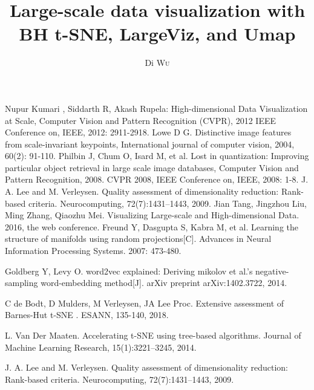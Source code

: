\documentclass{EPL-master-thesis-covers-EN}
\title{Large-scale data visualization with BH t-SNE, LargeViz, and Umap}
\author{Di \textsc{Wu}}
\begin{document}
  \maketitle
  
\thispagestyle{empty}		%



\listoftodos

\tableofcontents
\newpage


% 





\begin{thebibliography}{99}  
Nupur Kumari , Siddarth R, Akash Rupela: High-dimensional Data Visualization at Scale, Computer Vision and Pattern Recognition (CVPR), 2012 IEEE Conference on, IEEE, 2012: 2911-2918.  
Lowe D G. Distinctive image features from scale-invariant keypoints, International journal of computer vision, 2004, 60(2): 91-110.  
Philbin J, Chum O, Isard M, et al. Lost in quantization: Improving particular object retrieval in large scale image databases, Computer Vision and Pattern Recognition, 2008. CVPR 2008, IEEE Conference on, IEEE, 2008: 1-8.
J. A. Lee and M. Verleysen. Quality assessment of dimensionality reduction: Rank-based criteria. Neurocomputing, 72(7):1431–1443, 2009.
Jian Tang, Jingzhou Liu, Ming Zhang, Qiaozhu Mei. Visualizing Large-scale and High-dimensional Data. 2016, the web conference.
Freund Y, Dasgupta S, Kabra M, et al. Learning the structure of manifolds using random projections[C]. Advances in Neural Information Processing Systems. 2007: 473-480.

Goldberg Y, Levy O. word2vec explained: Deriving mikolov et al.’s negative-sampling word-embedding method[J]. arXiv preprint arXiv:1402.3722, 2014.

C de Bodt, D Mulders, M Verleysen, JA Lee Proc. Extensive assessment of Barnes-Hut t-SNE . ESANN, 135-140, 2018.

L. Van Der Maaten. Accelerating t-SNE using tree-based algorithms. Journal of Machine Learning Research, 15(1):3221–3245, 2014.

J. A. Lee and M. Verleysen. Quality assessment of dimensionality reduction: Rank-based criteria. Neurocomputing, 72(7):1431–1443, 2009.


\end{thebibliography}
\end{document}
